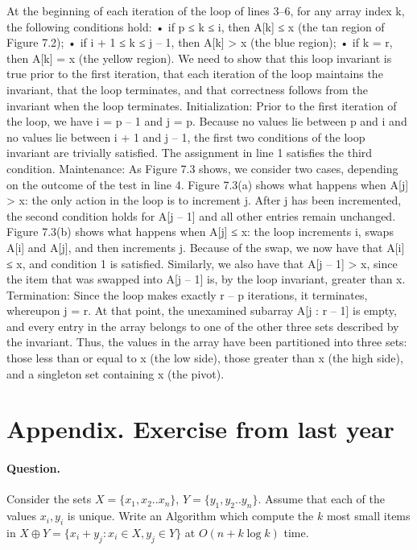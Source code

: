 At the beginning of each iteration of the loop of lines 3–6, for any array index k, the following conditions hold:
• if p ≤ k ≤ i, then A[k] ≤ x (the tan region of Figure 7.2);
• if i + 1 ≤ k ≤ j – 1, then A[k] > x (the blue region);
• if k = r, then A[k] = x (the yellow region).
We need to show that this loop invariant is true prior to the first iteration, that each iteration of the loop maintains the invariant, that the loop terminates, and that correctness follows from the invariant when the loop terminates.
Initialization: Prior to the first iteration of the loop, we have i = p – 1 and j = p. Because no values lie between p and i and no values lie between i + 1 and j – 1, the first two conditions of the loop invariant are trivially satisfied. The assignment in line 1 satisfies the third condition.
Maintenance: As Figure 7.3 shows, we consider two cases, depending on the outcome of the test in line 4. Figure 7.3(a) shows what happens when A[j] > x: the only action in the loop is to increment j. After j has been incremented, the second condition holds for A[j – 1] and all other entries remain unchanged. Figure 7.3(b) shows what happens when A[j] ≤ x: the loop increments i, swaps A[i] and A[j], and then increments j. Because of the swap, we now have that A[i] ≤ x, and condition 1 is satisfied. Similarly, we also have that A[j – 1] > x, since the item that was swapped into A[j – 1] is, by the loop invariant, greater than x.
Termination: Since the loop makes exactly r – p iterations, it terminates, whereupon j = r. At that point, the unexamined subarray A[j : r – 1] is empty, and every entry in the array belongs to one of the other three sets described by the invariant. Thus, the values in the array have been partitioned into three sets: those less than or equal to x (the low side), those greater than x (the high side), and a singleton set containing x (the pivot).


\section{ Appendix. Exercise from last year }

\paragraph{Question.} Consider the sets $X = \{x_1,x_2 .. x_n\}$, $Y = \{y_1, y_2 .. y_n\}$. Assume that each of the values $x_i,y_i$ is unique. Write an Algorithm which compute the $k$ most small items in $X \oplus Y = \{ x_{i} + y_{j} : x_{i} \in X , y_{j} \in Y  \} $ at $ O \left( n + k\log k  \right) $ time. 

